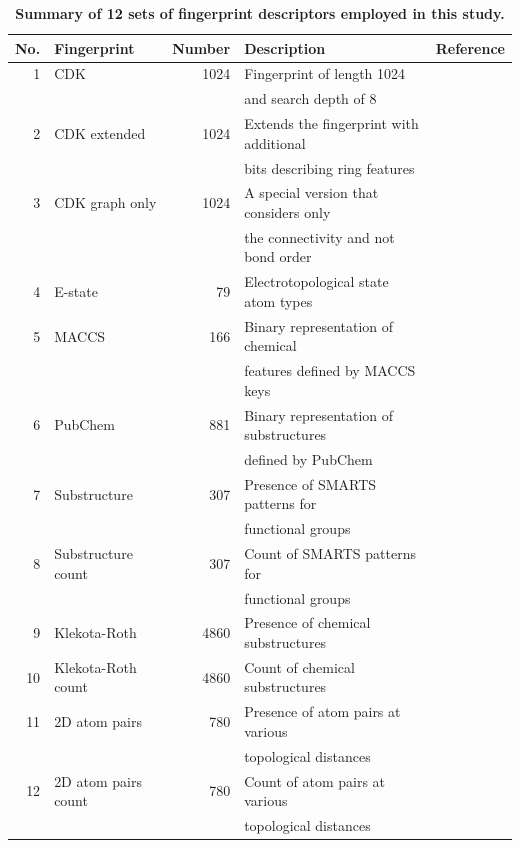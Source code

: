\documentclass[fleqn,10pt]{wlpeerj}
\newcommand\T{\rule{0pt}{4ex}}       %
\newcommand\B{\rule[-2ex]{0pt}{0pt}} %
\begin{document}
\begin{table}[!t]
\caption{\textbf{Summary of 12 sets of fingerprint descriptors employed in this study.}}
\label{table:fingerprints}
\centering
\begin{tabular}{rlrll}
\hline
No. & Fingerprint & Number & Description & Reference \T\B \\ 
\hline
1  & CDK                 & 1024 & Fingerprint of length 1024              & \cite{steinbeck2003chemistry} \T \\
   &                     &      & and search depth of 8                   & \\
2  & CDK extended        & 1024 & Extends the fingerprint with additional & \cite{steinbeck2003chemistry} \\
   &                     &      & bits describing ring features           & \\
3  & CDK graph only      & 1024 & A special version that considers only   & \cite{steinbeck2003chemistry} \\ 
   &                     &      & the connectivity and not bond order     & \\ 
4  & E-state             & 79   & Electrotopological state atom types     & \cite{hall1995electrotopological} \\ 
5  & MACCS               & 166  & Binary representation of chemical       & \cite{durant2002reoptimization} \\ 
   &                     &      & features defined by MACCS keys          & \\
6  & PubChem             & 881  & Binary representation of substructures  & \cite{pubchemfingerprint} \\ 
   &                     &      & defined by PubChem                      & \\
7  & Substructure        & 307  & Presence of SMARTS patterns for         &  \cite{laggner2005smarts} \\ 
   &                     &      & functional groups                       & \\
8  & Substructure count  & 307  & Count of SMARTS patterns for            & \cite{laggner2005smarts} \\ 
   &                     &      & functional groups                       & \\
9  & Klekota-Roth        & 4860 & Presence of chemical substructures      & \cite{klekota2008chemical} \\ 
10 & Klekota-Roth count  & 4860 & Count of chemical substructures         & \cite{klekota2008chemical} \\ 
11 & 2D atom pairs       & 780  & Presence of atom pairs at various       & \cite{carhart1985atom} \\ 
   &                     &      & topological distances                   & \\
12 & 2D atom pairs count & 780  & Count of atom pairs at various          & \cite{carhart1985atom} \\ 
   &                     &      & topological distances                   & \B \\
\hline
\end{tabular}
\end{table}
\end{document}
